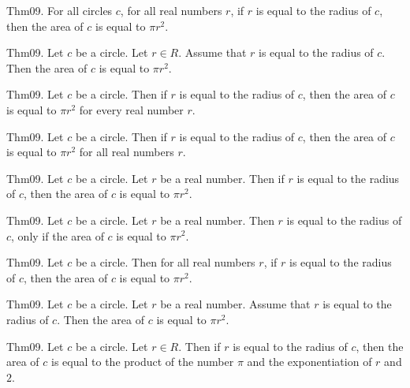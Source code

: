 \documentclass{article}
\begin{document}
Thm09. For all circles $c$, for all real numbers $r$, if $r$ is equal to the radius of $c$, then the area of $c$ is equal to $\pi r ^ {2}$.

Thm09. Let $c$ be a circle. Let $r \in R$. Assume that $r$ is equal to the radius of $c$. Then the area of $c$ is equal to $\pi r ^ {2}$.

Thm09. Let $c$ be a circle. Then if $r$ is equal to the radius of $c$, then the area of $c$ is equal to $\pi r ^ {2}$ for every real number $r$.

Thm09. Let $c$ be a circle. Then if $r$ is equal to the radius of $c$, then the area of $c$ is equal to $\pi r ^ {2}$ for all real numbers $r$.

Thm09. Let $c$ be a circle. Let $r$ be a real number. Then if $r$ is equal to the radius of $c$, then the area of $c$ is equal to $\pi r ^ {2}$.

Thm09. Let $c$ be a circle. Let $r$ be a real number. Then $r$ is equal to the radius of $c$, only if the area of $c$ is equal to $\pi r ^ {2}$.

Thm09. Let $c$ be a circle. Then for all real numbers $r$, if $r$ is equal to the radius of $c$, then the area of $c$ is equal to $\pi r ^ {2}$.

Thm09. Let $c$ be a circle. Let $r$ be a real number. Assume that $r$ is equal to the radius of $c$. Then the area of $c$ is equal to $\pi r ^ {2}$.

Thm09. Let $c$ be a circle. Let $r \in R$. Then if $r$ is equal to the radius of $c$, then the area of $c$ is equal to the product of the number \(\pi\) and the exponentiation of $r$ and $2$.
\end{document}

